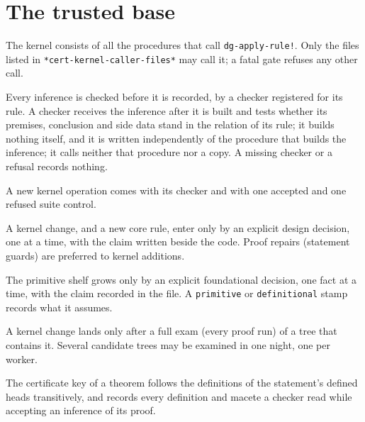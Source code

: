 \section*{The trusted base}
\begin{description}[style=nextline,leftmargin=1.4cm]
\item[DS-11]\label{ds:11} The kernel consists of all the procedures that call \texttt{dg-apply-rule!}. Only the files listed in \texttt{*cert-kernel-caller-files*} may call it; a fatal gate refuses any other call.
\item[DS-12]\label{ds:12} Every inference is checked before it is recorded, by a checker registered for its rule. A checker receives the inference after it is built and tests whether its premises, conclusion and side data stand in the relation of its rule; it builds nothing itself, and it is written independently of the procedure that builds the inference; it calls neither that procedure nor a copy. A missing checker or a refusal records nothing.
\item[DS-13]\label{ds:13} A new kernel operation comes with its checker and with one accepted and one refused suite control.
\item[DS-14]\label{ds:14} A kernel change, and a new core rule, enter only by an explicit design decision, one at a time, with the claim written beside the code. Proof repairs (statement guards) are preferred to kernel additions.
\item[DS-15]\label{ds:15} The primitive shelf grows only by an explicit foundational decision, one fact at a time, with the claim recorded in the file. A \texttt{primitive} or \texttt{definitional} stamp records what it assumes.
\item[DS-16]\label{ds:16} A kernel change lands only after a full exam (every proof run) of a tree that contains it. Several candidate trees may be examined in one night, one per worker.
\item[DS-17]\label{ds:17} The certificate key of a theorem follows the definitions of the statement's defined heads transitively, and records every definition and macete a checker read while accepting an inference of its proof.
\end{description}
